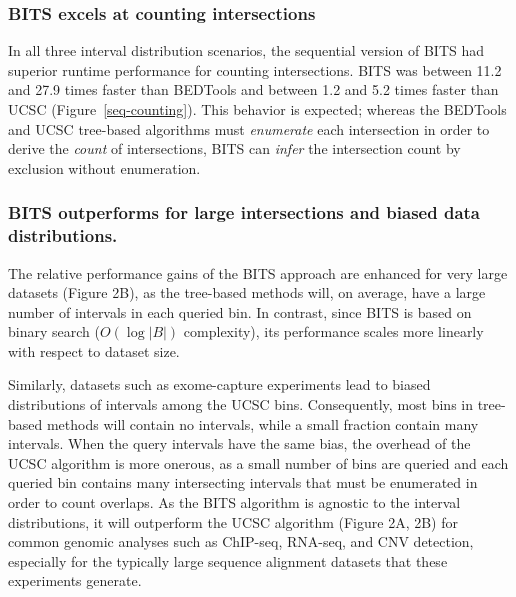 \documentclass{bioinfo}
\begin{document}
\subsubsection{BITS excels at counting intersections}

In all three interval distribution scenarios, the sequential version of BITS had
superior runtime performance for counting intersections.  BITS was between 11.2
and 27.9 times faster than BEDTools and between 1.2 and 5.2 times faster than
UCSC (Figure~\ref{seq-counting}). This behavior is expected; whereas the BEDTools and UCSC
tree-based algorithms must \emph{enumerate} each intersection in order to derive
the \emph{count} of intersections, BITS can \emph{infer} the intersection count
by exclusion without enumeration.

\subsubsection{BITS outperforms for large intersections and biased data
distributions.}
The relative performance gains of the BITS approach are enhanced for very large
datasets (Figure 2B), as the tree-based methods will, on average, have a large
number of intervals in each queried bin. In contrast, since BITS is based on
binary search ($O(\log |B|)$ complexity), its performance scales more linearly
with respect to dataset size.

Similarly, datasets such as exome-capture experiments lead to biased
distributions of intervals among the UCSC bins. Consequently, most bins in
tree-based methods will contain no intervals, while a small fraction contain
many intervals. When the query intervals have the same bias, the overhead of the
UCSC algorithm is more onerous, as a small number of bins are queried and each
queried bin contains many intersecting intervals that must be enumerated in
order to count overlaps. As the BITS algorithm is agnostic to the interval
distributions, it will outperform the UCSC algorithm (Figure 2A, 2B) for common
genomic analyses such as ChIP-seq, RNA-seq, and CNV detection, especially for
the typically large sequence alignment datasets that these experiments generate.

\end{document}
